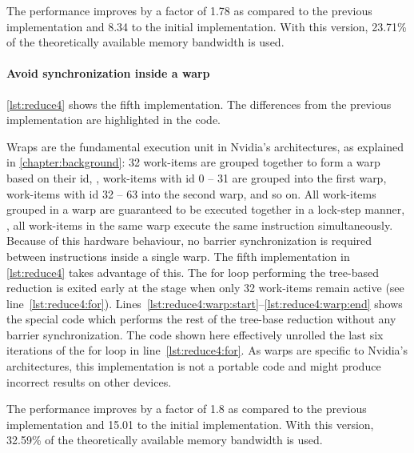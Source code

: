 The performance improves by a factor of 1.78 as compared to the previous implementation and 8.34 to the initial implementation.
With this version, 23.71\% of the theoretically available memory bandwidth is used.



\FloatBarrier
\newpage
\paragraph{Avoid synchronization inside a warp}

\autoref{lst:reduce4} shows the fifth implementation.
The differences from the previous implementation are highlighted in the code.

Wraps are the fundamental execution unit in Nvidia's \GPU architectures, as explained in \autoref{chapter:background}:
32 work-items are grouped together to form a warp based on their id, \ie, work-items with id 0 -- 31 are grouped into the first warp, work-items with id 32 -- 63 into the second warp, and so on.
All work-items grouped in a warp are guaranteed to be executed together in a lock-step manner, \ie, all work-items in the same warp execute the same instruction simultaneously.
Because of this hardware behaviour, no barrier synchronization is required between instructions inside a single warp.
The fifth implementation in \autoref{lst:reduce4} takes advantage of this.
The for loop performing the tree-based reduction is exited early at the stage when only 32 work-items remain active (see line~\ref{lst:reduce4:for}).
Lines~\ref{lst:reduce4:warp:start}--\ref{lst:reduce4:warp:end} shows the special code which performs the rest of the tree-base reduction without any barrier synchronization.
The code shown here effectively unrolled the last six iterations of the for loop in line~\ref{lst:reduce4:for}.
As warps are specific to Nvidia's \GPU architectures, this implementation is not a portable \OpenCL code and might produce incorrect results on other \OpenCL devices.

The performance improves by a factor of 1.8 as compared to the previous implementation and 15.01 to the initial implementation.
With this version, 32.59\% of the theoretically available memory bandwidth is used.

